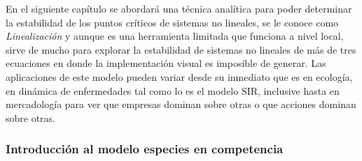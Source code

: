 \newpage
En el siguiente capítulo se abordará una técnica analítica para poder determinar la estabilidad de los puntos críticos de sistemas no lineales, se le conoce como \textit{Linealización} y aunque es una herramienta limitada que funciona a nivel local, sirve de mucho para explorar la estabilidad de sistemas no lineales de más de tres ecuaciones en donde la implementación visual es imposible de generar. Las aplicaciones de este modelo pueden variar desde su inmediato que es en ecología, en dinámica de enfermedades tal como lo es el modelo SIR, inclusive hasta en mercadología para ver que empresas dominan sobre otras o que acciones dominan sobre otras.
\subsubsection*{Introducción al modelo especies en competencia}

